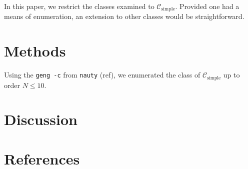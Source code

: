 \documentclass[12pt]{article}
\begin{document}
In this paper, we restrict the classes examined to $\mathcal{C}_\text{simple}$.
Provided one had a means of enumeration, an extension to other classes would be straightforward.

\section{Methods}
Using the \texttt{geng -c} from \texttt{nauty} (ref), we enumerated the class of $\mathcal{C}_\text{simple}$ up to order $N \le 10$.


\section{Discussion}


\section{References}
\end{document}

